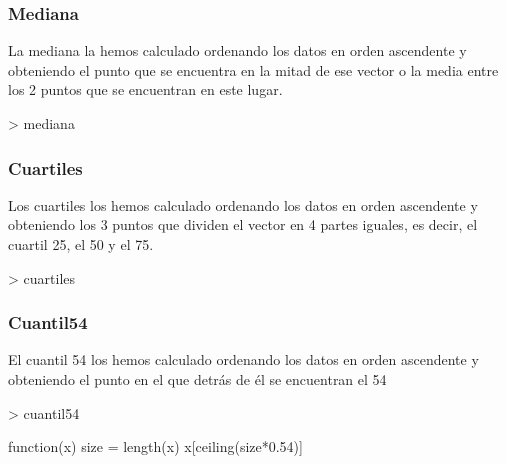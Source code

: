 \documentclass [a4paper] {article}
\begin{document}
\subsubsection{Mediana}
La mediana la hemos calculado ordenando los datos en orden ascendente 
y obteniendo el punto que se encuentra en la mitad de ese vector 
o la media entre los 2 puntos que se encuentran en este lugar.
\begin{Schunk}
\begin{Sinput}
> mediana
\end{Sinput}
\end{Schunk}
\subsubsection{Cuartiles}
Los cuartiles los hemos calculado ordenando los datos en orden ascendente 
y obteniendo los 3 puntos que dividen el vector en 4 partes iguales, es decir, 
el cuartil 25, el 50 y el 75.
\begin{Schunk}
\begin{Sinput}
> cuartiles
\end{Sinput}
\end{Schunk}
\subsubsection{Cuantil54}
El cuantil 54 los hemos calculado ordenando los datos en orden ascendente 
y obteniendo el punto en el que detrás de él se encuentran el 54%
\begin{Schunk}
\begin{Sinput}
> cuantil54
\end{Sinput}
\begin{Soutput}
function(x){
  size = length(x)
  x[ceiling(size*0.54)]
}
\end{Soutput}
\end{Schunk}
\end{document}
